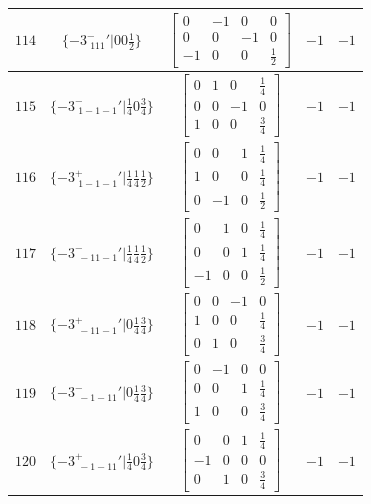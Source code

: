 \documentclass[fleqn,8pt]{jsarticle}
\begin{document}
\begin{longtable}{ccccc}
$ 114 $ & $ \{-3^{-}_{\,\,111}{}'|0 0 \frac{1}{2}\} $ & $ \begin{bmatrix} 0 & -1 & 0 & 0 \\ 0 & 0 & -1 & 0 \\ -1 & 0 & 0 & \frac{1}{2} \end{bmatrix} $ & $ -1 $ & $ -1 $ \\ \hline
$ 115 $ & $ \{-3^{-}_{\,\,1-1-1}{}'|\frac{1}{4} 0 \frac{3}{4}\} $ & $ \begin{bmatrix} 0 & 1 & 0 & \frac{1}{4} \\ 0 & 0 & -1 & 0 \\ 1 & 0 & 0 & \frac{3}{4} \end{bmatrix} $ & $ -1 $ & $ -1 $ \\ \hline
$ 116 $ & $ \{-3^{+}_{\,\,1-1-1}{}'|\frac{1}{4} \frac{1}{4} \frac{1}{2}\} $ & $ \begin{bmatrix} 0 & 0 & 1 & \frac{1}{4} \\ 1 & 0 & 0 & \frac{1}{4} \\ 0 & -1 & 0 & \frac{1}{2} \end{bmatrix} $ & $ -1 $ & $ -1 $ \\ \hline
$ 117 $ & $ \{-3^{-}_{\,\,-11-1}{}'|\frac{1}{4} \frac{1}{4} \frac{1}{2}\} $ & $ \begin{bmatrix} 0 & 1 & 0 & \frac{1}{4} \\ 0 & 0 & 1 & \frac{1}{4} \\ -1 & 0 & 0 & \frac{1}{2} \end{bmatrix} $ & $ -1 $ & $ -1 $ \\ \hline
$ 118 $ & $ \{-3^{+}_{\,\,-11-1}{}'|0 \frac{1}{4} \frac{3}{4}\} $ & $ \begin{bmatrix} 0 & 0 & -1 & 0 \\ 1 & 0 & 0 & \frac{1}{4} \\ 0 & 1 & 0 & \frac{3}{4} \end{bmatrix} $ & $ -1 $ & $ -1 $ \\ \hline
$ 119 $ & $ \{-3^{-}_{\,\,-1-11}{}'|0 \frac{1}{4} \frac{3}{4}\} $ & $ \begin{bmatrix} 0 & -1 & 0 & 0 \\ 0 & 0 & 1 & \frac{1}{4} \\ 1 & 0 & 0 & \frac{3}{4} \end{bmatrix} $ & $ -1 $ & $ -1 $ \\ \hline
$ 120 $ & $ \{-3^{+}_{\,\,-1-11}{}'|\frac{1}{4} 0 \frac{3}{4}\} $ & $ \begin{bmatrix} 0 & 0 & 1 & \frac{1}{4} \\ -1 & 0 & 0 & 0 \\ 0 & 1 & 0 & \frac{3}{4} \end{bmatrix} $ & $ -1 $ & $ -1 $ \\ \hline

\end{longtable}
\end{document}
